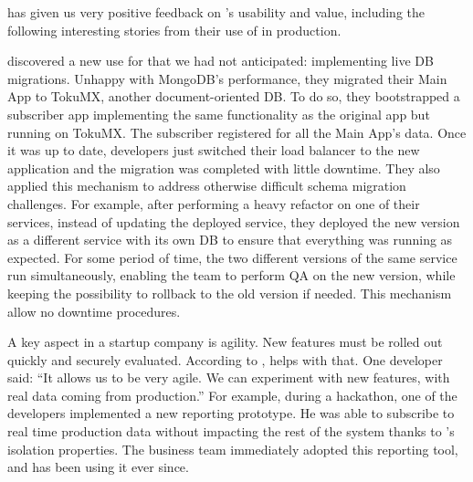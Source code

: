 \crowdtap has given us very positive feedback on \synapse's
usability and value, including the following interesting stories from
their use of \synapse in production.

 \crowdtap discovered a new use for
\synapse that we had not anticipated: implementing live DB
migrations.  Unhappy with MongoDB's performance, they migrated their Main App to
TokuMX, another document-oriented DB.  To do so, they bootstrapped a subscriber
app implementing the same functionality as the original app but running on
TokuMX. The subscriber registered for all the Main App's data.  Once it was up
to date, developers just switched their load balancer to the new application and
the migration was completed with little downtime.  They also applied this
mechanism to address otherwise difficult schema migration challenges.
For example, after performing a heavy refactor on one of their services,
instead of updating the deployed service, they deployed the new version
as a different service with its own DB to ensure that everything was
running as expected. For some period of time, the two different versions of the
same service run simultaneously, enabling the team to perform QA on the new
version, while keeping the possibility to rollback to the old version if needed.
This mechanism allow no downtime procedures.

 A key aspect in a startup company is
agility.  New features must be rolled out quickly and securely evaluated.
According to \crowdtap, \synapse helps with that. One developer said: ``It
allows us to be very agile. We can experiment with new features, with real
data coming from production.''  For example, during a hackathon, one of the
developers implemented a new reporting prototype. He was able to subscribe to
real time production data without impacting the rest of the system thanks to
\synapse's isolation properties. The business team immediately adopted this
reporting tool, and has been using it ever since.

